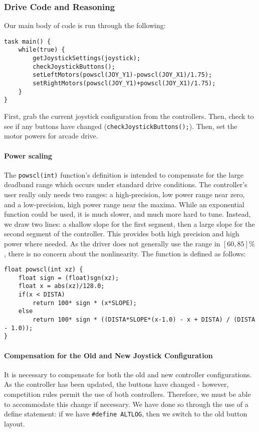 \subsubsection{Drive Code and Reasoning}

Our main body of code is run through the following:

\begin{lstlisting}[tabsize=4]
task main() {
	while(true) {
		getJoystickSettings(joystick);
		checkJoystickButtons();
		setLeftMotors(powscl(JOY_Y1)-powscl(JOY_X1)/1.75);
		setRightMotors(powscl(JOY_Y1)+powscl(JOY_X1)/1.75);
	}
}
\end{lstlisting}

First, grab the current joystick configuration from the controllers. Then, check to see if any buttons have changed (\lstinline{checkJoystickButtons();}{}). Then, set the motor powers for arcade drive. 

\paragraph{Power scaling} The \lstinline{powscl(int)}{} function's definition is intended to compensate for the large deadband range which occurs under standard drive conditions. The controller's user really only needs two ranges: a high-precision, low power range near zero, and a low-precision, high power range near the maxima. While an exponential function could be used, it is much slower, and much more hard to tune. Instead, we draw two lines: a shallow slope for the first segment, then a large slope for the second segment of the controller. This provides both high precision and high power where needed. As the driver does not generally use the range in $[60,85]\%$, there is no concern about the nonlinearity. The function is defined as follows:

\begin{lstlisting}[tabsize=4]
float powscl(int xz) {
	float sign = (float)sgn(xz);
	float x = abs(xz)/128.0;
	if(x < DISTA)
		return 100* sign * (x*SLOPE);
	else
		return 100* sign * ((DISTA*SLOPE*(x-1.0) - x + DISTA) / (DISTA - 1.0));
}
\end{lstlisting}

\paragraph{Compensation for the Old and New Joystick Configuration} It is necessary to compensate for both the old and new controller configurations. As the controller has been updated, the buttons have changed - however, competition rules permit the use of both controllers. Therefore, we must be able to accommodate this change if necessary. We have done so through the use of a define statement: if we have \lstinline{#define ALTLOG}{}, then we switch to the old button layout.

